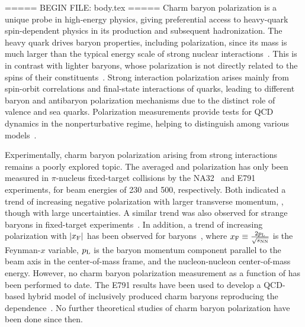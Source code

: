 ===== BEGIN FILE: body.tex =====
Charm baryon polarization is a unique probe in high-energy physics, giving preferential access to heavy-quark spin-dependent physics in its production and subsequent hadronization.
The heavy quark drives baryon properties, including polarization, since its mass is much larger than the typical energy scale of strong nuclear interactions~\cite{Mannel:1991bs,Falk:1993rf,Galanti:2015pqa}.
This is in contrast with lighter baryons, whose polarization is not directly related to the spins of their constituents~\cite{Ashman:1987hv,deFlorian:2008mr,Adolph:2015saz}. Strong interaction polarization arises mainly from spin-orbit correlations and final-state interactions of quarks, leading to different baryon and antibaryon polarization mechanisms due to the distinct role of valence and sea quarks. Polarization measurements provide tests for QCD dynamics in the nonperturbative regime, helping to distinguish among various models~\cite{Andersson:1979wj,Szwed:1981rr,DeGrand:1981pe,Dharmaratna:1989jr,Barni:1991qn,Soffer:1991am,Hama:1993aq,Dharmaratna:1996xd,Troshin:1996hd,Liang:1997rt,Felix:1999tf,Anselmino:2000vs,Kanazawa:2000cx,Anselmino:2001js,Boer:2007nh,Zhou:2008fb,Kanazawa:2015jxa,Koike:2015zya,Koike:2017fxr,Gamberg:2018fwy,DAlesio:2020wjq}.

Experimentally, charm baryon polarization arising from strong interactions remains a poorly explored topic.
The averaged \Lc and \Lcbar polarization has only been measured in $\pi$-nucleus fixed-target collisions by the NA32~\cite{Jezabek:1992ke} and E791~\cite{Aitala:1999uq} experiments, for beam energies of 230 and 500\gev, respectively.
Both indicated a trend of increasing negative polarization with larger transverse momentum, \pt, though with large uncertainties. A similar \pt trend was also observed for strange \Lz baryons in fixed-target experiments~\cite{Bunce:1976yb,Heller:1978ty,Lundberg:1989hw,Yuldashev:1990az, RAMBERG1994403,na48,HADES:2014ttv}. In addition, a trend of increasing polarization with $|x_{\rm F}|$ has been observed for \Lz baryons~\cite{Lundberg:1989hw, RAMBERG1994403,na48, Abt_2006, LHCb-PAPER-2024-009}, where $x_{\rm F}\equiv\frac{2p_{\rm L}}{\protect\sqrt{s_{\scriptscriptstyle\text{NN}}}}$ is the Feynman-$x$ variable, $p_{\rm L}$ is the baryon momentum component parallel to the beam axis in the center-of-mass frame, and \sqsnn the nucleon-nucleon center-of-mass energy.
However, no charm baryon polarization measurement as a function of \xf has been performed to date.
The E791 results have been used to develop a QCD-based hybrid model of inclusively produced charm baryons reproducing the \pt dependence~\cite{Goldstein:1999jr}. No further theoretical studies of charm baryon polarization have been done since then.

